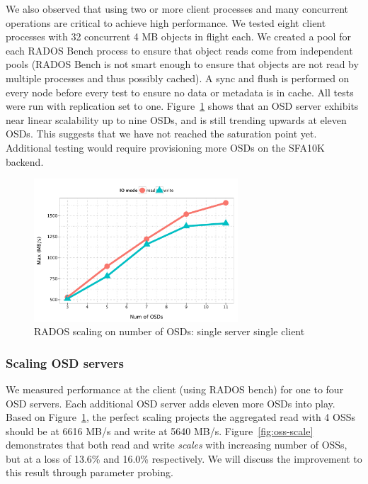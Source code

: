 We also observed that using two or more client processes and many concurrent
operations are critical to achieve high performance.  We tested eight client
processes with 32 concurrent 4 MB objects in flight each. We created a pool
for each RADOS Bench process to ensure that object reads come from independent
pools (RADOS Bench is not smart enough to ensure that objects are not read by
multiple processes and thus possibly cached).  A sync and flush is performed
on every node before every test to ensure no data or metadata is in cache.
All tests were run with replication set to one. Figure~\ref{fig:osd-scale}
shows that an OSD server exhibits near linear scalability up to
nine OSDs, and is still trending upwards at eleven OSDs. This suggests that we
have not reached the saturation point yet. Additional testing would require
provisioning more OSDs on the SFA10K backend.
%


\begin{figure}[htb]
\centering
\includegraphics[width=3in]{data/rados_osd}
\caption{RADOS scaling on number of OSDs: single server single client}
\label{fig:osd-scale}
\end{figure}

\subsubsection{Scaling OSD servers}

We measured performance at the client (using RADOS bench) for one to four OSD
servers. Each additional OSD server adds eleven more OSDs into play. Based on
Figure~\ref{fig:osd-scale}, the perfect scaling projects the aggregated read
with 4 OSSs should be at 6616 MB/s and write at 5640 MB/s.
Figure~\ref{fig:oss-scale} demonstrates that both read and write
\textit{scales} with increasing number of OSSs, but at a loss of 13.6\% and
16.0\% respectively. We will discuss the improvement to this result through
parameter probing.

